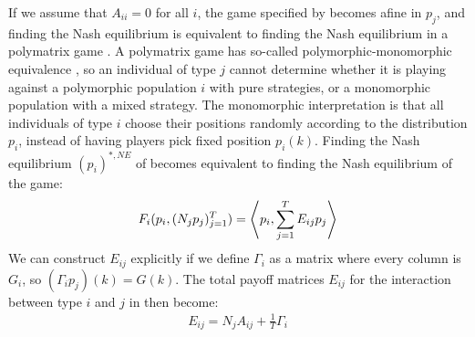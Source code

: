 

If we assume that $A_{ii}=0$ for all $i$, the game specified by  becomes afine in $p_j$, and finding the Nash equilibrium is equivalent to finding the Nash equilibrium in a polymatrix game \citep{howson1972equilibria, eaves1973polymatrix}. A polymatrix game has so-called polymorphic-monomorphic equivalence \citep{broom2013game, eaves1973polymatrix}, so an individual of type $j$ cannot determine whether it is playing against a polymorphic population $i$ with pure strategies, or a monomorphic population with a mixed strategy. The monomorphic interpretation is that all individuals of type $i$ choose their positions randomly according to the distribution $p_i$, instead of having players pick fixed position $p_i(k)$. Finding the Nash equilibrium $(p_i)^{*,NE}$ of  becomes equivalent to finding the Nash equilibrium of the game:
\begin{equation}
  \label{eq:poly_fitness}
  F_i(p_i, (N_j p_j)_{j=1}^T) = \left \langle p_i,\sum_{j=1}^T E_{ij} p_j \right \rangle
\end{equation}
We can construct $E_{ij}$ explicitly if we define $\Gamma_i$ as a matrix where every column is $G_i$, so $(\Gamma_i p_j)(k) = G(k)$. The total payoff matrices $E_{ij}$ for the interaction between type $i$ and $j$ in  then become:
\begin{equation}
  \label{eq:disc_tot_payoff}
  \begin{split}
    E_{ij} = N_j A_{ij} + \frac{1}{T}\Gamma_i%
  \end{split}
\end{equation}
